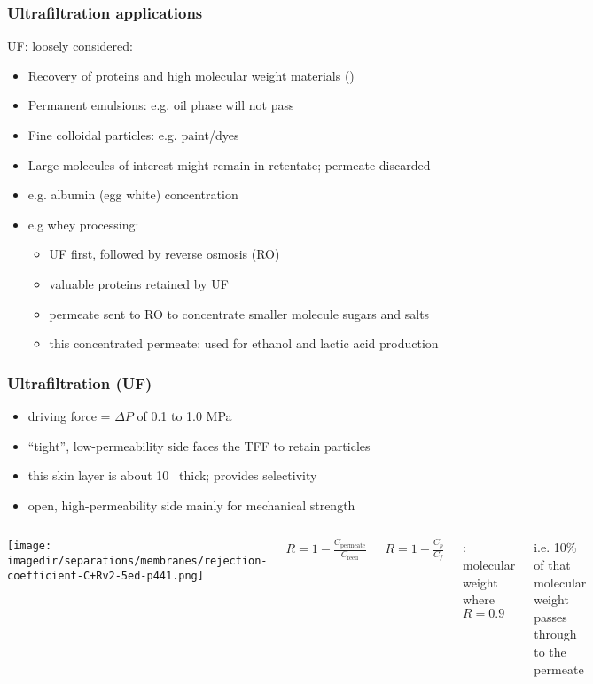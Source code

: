 \begin{frame}\frametitle{Ultrafiltration applications} 
	UF: loosely considered: {\color{myGreen}{``cross-flow filtration at molecular level''}}
	\begin{itemize}
		\item	Recovery of proteins and high molecular weight materials ({\color{purple}{solute}})
		\item	Permanent emulsions: e.g. oil phase will not pass
		\item	Fine colloidal particles: e.g. paint/dyes 
		\item	Large molecules of interest might remain in retentate; permeate discarded
		\item	e.g. albumin (egg white) concentration
		\item	e.g whey processing:
		\begin{itemize}
			\item	UF first, followed by reverse osmosis (RO)
			\item	valuable proteins retained by UF
			\item	permeate sent to RO to concentrate smaller molecule sugars and salts
			\item	this concentrated permeate: used for ethanol and lactic acid production
		\end{itemize}
	\end{itemize}
\end{frame}

\begin{frame}\frametitle{Ultrafiltration (UF)}
	
	\begin{itemize}		
		\item	driving force = $\Delta P$ of 0.1 to 1.0 MPa %
		\item	``tight'', low-permeability side faces the TFF to retain particles
		\item	this skin layer is about 10\micron~ thick; provides selectivity 
		\item	open, high-permeability side mainly for mechanical strength %
	\end{itemize}
	
	
	\begin{columns}[t]
			\begin{center}
				\texttt{[image: \\imagedir/separations/membranes/rejection-coefficient-C+Rv2-5ed-p441.png]}
			\end{center}
		
			$R = 1 -\displaystyle \frac{C_\text{permeate}}{C_\text{feed}}$
			
			$R = 1- \displaystyle \frac{C_p}{C_f}$
			
			\vspace{12pt}
			{\color{purple}{MWCO}}: molecular weight where $R=0.9$
			
			\vspace{12pt}
			i.e. 10\% of that molecular weight passes through to the permeate
	\end{columns}	
\end{frame}

